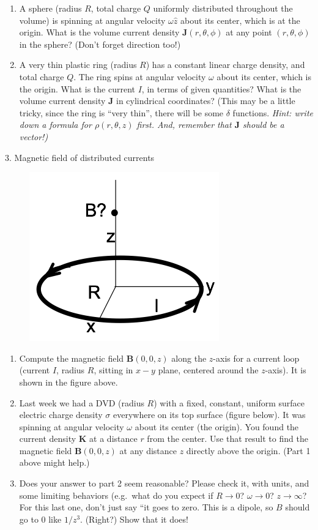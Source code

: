 \documentclass[11pt]{article}
\def\tightlist{}
\begin{document}
\begin{enumerate}
\def\labelenumi{\arabic{enumi}.}
\tightlist
\item
  A sphere (radius \(R\), total charge \(Q\) uniformly distributed
  throughout the volume) is spinning at angular velocity
  \(\omega \hat{z}\) about its center, which is at the origin. What is
  the volume current density \(\mathbf{J}(r, \theta, \phi)\) at any
  point \((r, \theta, \phi)\) in the sphere? (Don't forget direction
  too!)
\item
  A very thin plastic ring (radius \(R\)) has a constant linear charge
  density, and total charge \(Q\). The ring spins at angular velocity
  \(\omega\) about its center, which is the origin. What is the current
  \(I\), in terms of given quantities? What is the volume current
  density \(\mathbf{J}\) in cylindrical coordinates? (This may be a
  little tricky, since the ring is ``very thin'', there will be some
  \(\delta\) functions. \emph{Hint: write down a formula for
  \(\rho(r,\theta,z)\) first. And, remember that \(\mathbf{J}\) should
  be a vector!)}
\end{enumerate}

{\Large 3. Magnetic field of distributed
currents}\label{magnetic-field-of-distributed-currents}

\begin{figure}[htbp]
\centering
\includegraphics[width=0.3\linewidth]{./images/hw9/ring.png}
\end{figure}

\begin{enumerate}
\def\labelenumi{\arabic{enumi}.}
\tightlist
\item
  Compute the magnetic field \(\mathbf{B}(0,0,z)\) along the \(z\)-axis
  for a current loop (current \(I\), radius \(R\), sitting in \(x-y\)
  plane, centered around the \(z\)-axis). It is shown in the figure
  above.
\item
  Last week we had a DVD (radius \(R\)) with a fixed, constant, uniform
  surface electric charge density \(\sigma\) everywhere on its top
  surface (figure below). It was spinning at angular velocity \(\omega\)
  about its center (the origin). You found the current density
  \(\mathbf{K}\) at a distance \(r\) from the center. Use that result to
  find the magnetic field \(\mathbf{B}(0,0,z)\) at any distance \(z\)
  directly above the origin. (Part 1 above might help.)
\item
  Does your answer to part 2 seem reasonable? Please check it, with
  units, and some limiting behaviors (e.g.~what do you expect if
  \(R \rightarrow 0\)? \(\omega \rightarrow 0\)?
  \(z\rightarrow \infty\)? For this last one, don't just say ``it goes
  to zero. This is a dipole, so \(B\) should go to 0 like \(1/z^3\).
  (Right?) Show that it does!
\end{enumerate}
\end{document}
